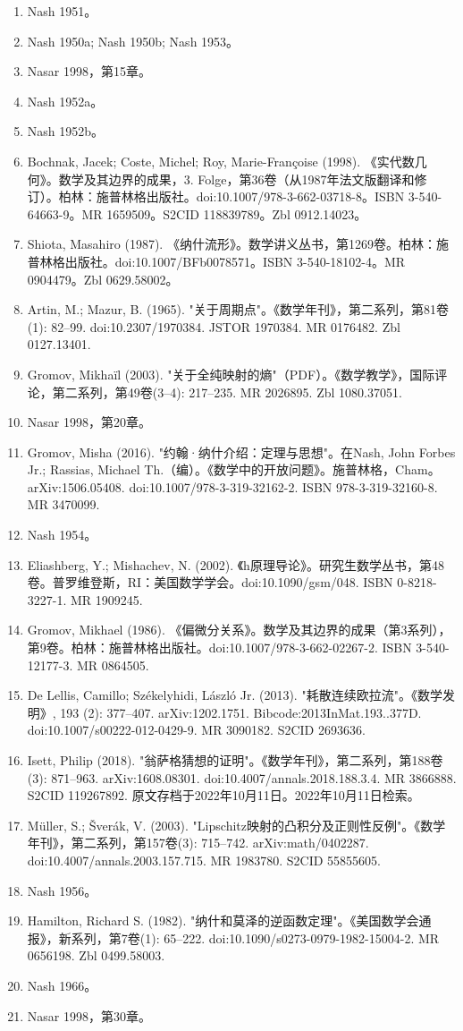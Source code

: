 \begin{enumerate}
\item Nash 1951。
\item Nash 1950a; Nash 1950b; Nash 1953。
\item Nasar 1998，第15章。
\item Nash 1952a。
\item Nash 1952b。
\item Bochnak, Jacek; Coste, Michel; Roy, Marie-Françoise (1998). 《实代数几何》。数学及其边界的成果，3. Folge，第36卷（从1987年法文版翻译和修订）。柏林：施普林格出版社。doi:10.1007/978-3-662-03718-8。ISBN 3-540-64663-9。MR 1659509。S2CID 118839789。Zbl 0912.14023。
\item Shiota, Masahiro (1987). 《纳什流形》。数学讲义丛书，第1269卷。柏林：施普林格出版社。doi:10.1007/BFb0078571。ISBN 3-540-18102-4。MR 0904479。Zbl 0629.58002。
\item Artin, M.; Mazur, B. (1965). "关于周期点"。《数学年刊》，第二系列，第81卷(1): 82–99. doi:10.2307/1970384. JSTOR 1970384. MR 0176482. Zbl 0127.13401.
\item Gromov, Mikhaïl (2003). "关于全纯映射的熵"（PDF）。《数学教学》，国际评论，第二系列，第49卷(3–4): 217–235. MR 2026895. Zbl 1080.37051.
\item Nasar 1998，第20章。
\item Gromov, Misha (2016). "约翰·纳什介绍：定理与思想"。在Nash, John Forbes Jr.; Rassias, Michael Th.（编）。《数学中的开放问题》。施普林格，Cham。arXiv:1506.05408. doi:10.1007/978-3-319-32162-2. ISBN 978-3-319-32160-8. MR 3470099.
\item Nash 1954。
\item Eliashberg, Y.; Mishachev, N. (2002). 《h原理导论》。研究生数学丛书，第48卷。普罗维登斯，RI：美国数学学会。doi:10.1090/gsm/048. ISBN 0-8218-3227-1. MR 1909245.
\item Gromov, Mikhael (1986). 《偏微分关系》。数学及其边界的成果（第3系列），第9卷。柏林：施普林格出版社。doi:10.1007/978-3-662-02267-2. ISBN 3-540-12177-3. MR 0864505.
\item De Lellis, Camillo; Székelyhidi, László Jr. (2013). "耗散连续欧拉流"。《数学发明》, 193 (2): 377–407. arXiv:1202.1751. Bibcode:2013InMat.193..377D. doi:10.1007/s00222-012-0429-9. MR 3090182. S2CID 2693636.
\item Isett, Philip (2018). "翁萨格猜想的证明"。《数学年刊》，第二系列，第188卷(3): 871–963. arXiv:1608.08301. doi:10.4007/annals.2018.188.3.4. MR 3866888. S2CID 119267892. 原文存档于2022年10月11日。2022年10月11日检索。
\item Müller, S.; Šverák, V. (2003). "Lipschitz映射的凸积分及正则性反例"。《数学年刊》，第二系列，第157卷(3): 715–742. arXiv:math/0402287. doi:10.4007/annals.2003.157.715. MR 1983780. S2CID 55855605.
\item Nash 1956。
\item Hamilton, Richard S. (1982). "纳什和莫泽的逆函数定理"。《美国数学会通报》，新系列，第7卷(1): 65–222. doi:10.1090/s0273-0979-1982-15004-2. MR 0656198. Zbl 0499.58003.
\item Nash 1966。
\item Nasar 1998，第30章。
\end{enumerate}